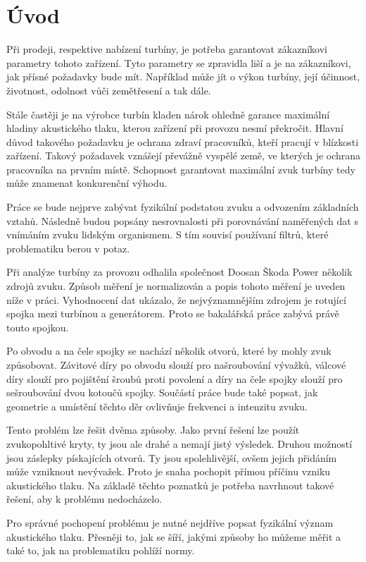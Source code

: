 \chapter*{Úvod}\label{chap:uvod}

Při prodeji, respektive nabízení turbíny, je potřeba garantovat zákazníkovi parametry tohoto zařízení. Tyto parametry se zpravidla liší a je na zákazníkovi, jak přísné požadavky bude mít. Například může jít o výkon turbíny, její účinnost, životnost, odolnost vůči zemětřesení a tak dále. 

Stále častěji je na výrobce turbín kladen nárok ohledně garance maximální hladiny akustického tlaku, kterou zařízení při provozu nesmí překročit. Hlavní důvod takového požadavku je ochrana zdraví pracovníků, kteří pracují v blízkosti zařízení. Takový požadavek vznášejí převážně vyspělé země, ve kterých je ochrana pracovníka na prvním místě. Schopnost garantovat maximální zvuk turbíny tedy může znamenat konkurenční výhodu.

Práce se bude nejprve zabývat fyzikální podstatou zvuku a odvozením základních vztahů. Následně budou popsány nesrovnalosti při porovnávání naměřených dat s vnímáním zvuku lidským organismem. S tím souvisí používaní filtrů, které problematiku berou v potaz.

Při analýze turbíny za provozu odhalila společnost Doosan Škoda Power několik zdrojů zvuku. Způsob měření je normalizován a popis tohoto měření je uveden níže v práci. Vyhodnocení dat ukázalo, že nejvýznamnějším zdrojem je rotující spojka mezi turbínou a generátorem. Proto se bakalářská práce zabývá právě touto spojkou.

Po obvodu a na čele spojky se nachází několik otvorů, které by mohly zvuk způsobovat. Závitové díry po obvodu slouží pro našroubování vývažků, válcové díry slouží pro pojištění šroubů proti povolení a díry na čele spojky slouží pro sešroubování dvou kotoučů spojky. Součástí práce bude také popsat, jak geometrie a umístění těchto děr ovlivňuje frekvenci a intenzitu zvuku. 

Tento problém lze řešit dvěma způsoby. Jako první řešení lze použít zvukopohltivé kryty, ty jsou ale drahé a nemají jistý výsledek. Druhou možností jsou záslepky pískajících otvorů. Ty jsou spolehlivější, ovšem jejich přidáním může vzniknout nevývažek. Proto je snaha pochopit přímou příčinu vzniku akustického tlaku. Na základě těchto poznatků je potřeba navrhnout takové řešení, aby k problému nedocházelo.

Pro správné pochopení problému je nutné nejdříve popsat fyzikální význam akustického tlaku. Přesněji to, jak se šíří, jakými způsoby ho můžeme měřit a také to, jak na problematiku pohlíží normy.  




